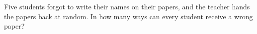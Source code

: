 Five students forgot to write their names on their papers, and the teacher hands the papers back at random. In how many ways can every student receive a wrong paper?
